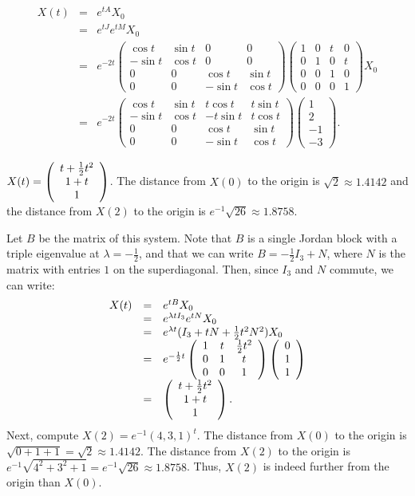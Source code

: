 \[
\begin{array}{rcl}
X(t) & = & e^{tA}X_0 \\
& = & e^{tJ}e^{tM}X_0 \\
& = & e^{-2t}\left(\begin{array}{rr|rr}
\cos t & \sin t & 0 & 0 \\
-\sin t & \cos t & 0 & 0 \\
\hline
0 & 0 & \cos t & \sin t \\
0 & 0 & -\sin t & \cos t
\end{array}\right)
\left(\begin{array}{rr|rr}
1 & 0 & t & 0 \\
0 & 1 & 0 & t \\
\hline
0 & 0 & 1 & 0 \\
0 & 0 & 0 & 1
\end{array}\right)X_0 \\
& = & e^{-2t}
\left(\begin{array}{rr|rr}
\cos t & \sin t & t\cos t & t\sin t \\
-\sin t & \cos t & -t\sin t & t\cos t \\
\hline
0 & 0 & \cos t & \sin t \\
0 & 0 & -\sin t & \cos t
\end{array}\right)
\left(\begin{array}{r} 1 \\ 2 \\ -1 \\ -3 \end{array}\right).
\end{array}
\]

  \ans $X(t) = \left(\begin{array}{c} t + \frac{1}{2}t^2 \\ 1 + t \\ 1\end{array}\right)$. The distance from $X(0)$ to the 
origin is $\sqrt{2} \approx 1.4142$ and the distance from $X(2)$ to the origin is
$e^{-1}\sqrt{26} \approx 1.8758$.

\soln Let $B$ be the matrix of this system.  Note that $B$ is a single Jordan block
with a triple eigenvalue at $\lambda = -\frac{1}{2}$, and that we can write
$B = -\frac{1}{2}I_3 + N$, where $N$ is the matrix with entries $1$ on the
superdiagonal.  Then, since $I_3$ and $N$ commute, we can write:
\[
\begin{array}{rcl}
X(t) & = & e^{tB}X_0 \\
& = & e^{\lambda tI_3}e^{tN}X_0 \\
& = & e^{\lambda t}(I_3 + tN + \frac{1}{2}t^2N^2)X_0 \\
& = & e^{-\frac{1}{2} t}\left(\begin{array}{ccc} 1 & t & \frac{1}{2}t^2 \\ 0 & 1 & t \\ 0 & 0 & 1\end{array}\right)
\left(\begin{array}{r} 0 \\ 1 \\ 1\end{array}\right) \\
& = & \left(\begin{array}{c} t + \frac{1}{2}t^2 \\ 1 + t \\ 1\end{array}\right).
\end{array}
\]
Next, compute $X(2) = e^{-1}(4,3,1)^t$.
The distance from $X(0)$ to the origin is $\sqrt{0 + 1 + 1} = \sqrt{2}
\approx 1.4142$.  The distance from $X(2)$ to the origin is
$e^{-1}\sqrt{4^2 + 3^2 + 1} = e^{-1}\sqrt{26} \approx 1.8758$.
Thus, $X(2)$ is indeed further from the origin than $X(0)$.

